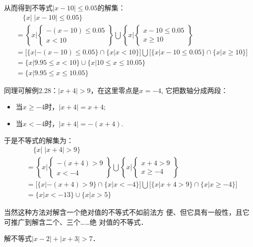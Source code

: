 从而得到不等式$|x-10|\le 0.05$的解集：
\[\begin{split}
  &\quad   \{x|\; |x-10|\le 0.05\}\\
  &=\left\{x\Big| \begin{cases}
    -(x-10)\le 0.05\\x<10
\end{cases}\right\}\bigcup \left\{x\Big| \begin{cases}
    x-10\le 0.05\\x\ge 10
\end{cases}\right\}\\
&=\Big[\{x|-(x-10)\le 0.05\}\cap\{x|x<10\}\Big]\bigcup\Big[\{x|x-10\le 0.05\}\cap\{x|x\ge 10\}\Big]\\
&=\{x|9.95\le x<10\}\cup\{x|10\le x\le 10.05\}\\
&=\{x|9.95\le x\le 10.05\}
\end{split}
    \]

    同理可解例2.28：$|x+4|>9$，在这里零点是$x=-4$, 它把数轴分成两段：
    \begin{itemize}
        \item  当$x\ge -4$时，$|x+4|=x+4$;
        \item  当$x<-4$时，$|x+4|=-(x+4)$.
    \end{itemize}
    于是不等式的解集为：
\[\begin{split}
    &\quad \{x|\; |x+4|>9\} \\
&= \left\{x\Big|\begin{cases}
    -(x+4)>9\\x<-4
\end{cases}\right\}\bigcup \left\{x\Big|\begin{cases}
    x+4>9\\x\ge -4
\end{cases}\right\}\\
    &=\Big[\{x|-(x+4)>9\}\cap\{x|x<-4\}\Big]\bigcup\Big[\{x|x+4>9\}\cap\{x|x\ge -4\}\Big]\\
    &=\{x|x<-13\}\cup\{x|x>5\}
\end{split}\]

当然这种方法对解含一个绝对值的不等式不如前法方
便、但它具有一般性，且它可推广到解含二个、三个……绝
对值的不等式．

\begin{example}
    解不等式$|x-2|+|x+3|>7$．
\end{example}

